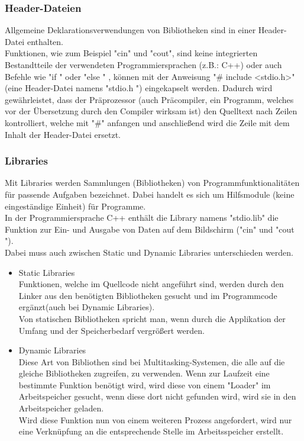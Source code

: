 \documentclass[12pt,a4paper]{report}
\begin{document}
\begin{onehalfspace}
\subsubsection{Header-Dateien}
Allgemeine Deklarationsverwendungen von Bibliotheken sind in einer Header-Datei enthalten.
\\Funktionen, wie zum Beispiel "{}cin"{} und "{}cout{}", sind keine integrierten Bestandtteile der verwendeten Programmiersprachen (z.B.: C++) oder auch Befehle wie "{}if "{} oder "{}else "{} , können mit der Anweisung "{}\# include \textless stdio.h\textgreater "{} (eine Header-Datei namens "{}stdio.h "{}) eingekapselt werden. Dadurch wird gewährleistet, dass der Präprozessor (auch Präcompiler, ein Programm, welches vor der Übersetzung durch den Compiler wirksam ist) den Quelltext nach Zeilen kontrolliert, welche mit "{}\#"{} anfangen und anschließend wird die Zeile mit dem Inhalt der Header-Datei ersetzt.

\subsubsection{Libraries}
Mit Libraries werden Sammlungen (Bibliotheken) von Programmfunktionalitäten für passende Aufgaben bezeichnet. Dabei handelt es sich um Hilfsmodule (keine eingeständige Einheit) für Programme.\\
In der Programmiersprache C++ enthält die Library namens "{}stdio.lib"{} die Funktion zur Ein- und Ausgabe von Daten auf dem Bildschirm ("{}cin"{} und "{}cout "{}).\\
Dabei muss auch zwischen Static und Dynamic Libraries unterschieden werden.

\begin{itemize}
\item Static Libraries\\
Funktionen, welche im Quellcode nicht angeführt sind, werden durch den Linker aus den benötigten Bibliotheken gesucht und im Programmcode ergänzt(auch bei Dynamic Libraries).
\\Von statischen Bibliotheken spricht man, wenn durch die Applikation der Umfang und der Speicherbedarf vergrößert werden.
\item Dynamic Libraries\\
Diese Art von Bibliothen sind bei Multitasking-Systemen, die alle auf die gleiche Bibliotheken zugreifen, zu verwenden. Wenn zur Laufzeit eine bestimmte Funktion benötigt wird, wird diese von einem "{}Loader"{} im Arbeitspeicher gesucht, wenn diese dort nicht gefunden wird, wird sie in den Arbeitspeicher geladen.
\\Wird diese Funktion nun von einem weiteren Prozess angefordert, wird nur eine Verknüpfung an die entsprechende Stelle im Arbeitsspeicher erstellt.\\


\end{itemize}
\end{onehalfspace}
\end{document}
